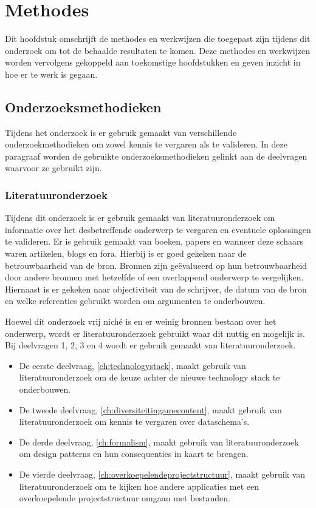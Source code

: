 \chapter{Methodes}
\label{ch:methodes}
Dit hoofdstuk omschrijft de methodes en werkwijzen die toegepast zijn tijdens dit onderzoek om tot de behaalde resultaten te komen. Deze methodes en werkwijzen worden vervolgens gekoppeld aan toekomstige hoofdstukken en geven inzicht in hoe er te werk is gegaan.

\section{Onderzoeksmethodieken}
Tijdens het onderzoek is er gebruik gemaakt van verschillende onderzoekmethodieken om zowel kennis te vergaren als te valideren. In deze paragraaf worden de gebruikte onderzoeksmethodieken gelinkt aan de deelvragen waarvoor ze gebruikt zijn.

\subsection{Literatuuronderzoek}
Tijdens dit onderzoek is er gebruik gemaakt van literatuuronderzoek om informatie over het desbetreffende onderwerp te vergaren en eventuele oplossingen te valideren. Er is gebruik gemaakt van boeken, papers en wanneer deze schaars waren artikelen, blogs en fora. Hierbij is er goed gekeken naar de betrouwbaarheid van de bron. Bronnen zijn geëvalueerd op hun betrouwbaarheid door andere bronnen met hetzelfde of een overlappend onderwerp te vergelijken. Hiernaast is er gekeken naar objectiviteit van de schrijver, de datum van de bron en welke referenties gebruikt worden om argumenten te onderbouwen.

Hoewel dit onderzoek vrij niché is en er weinig bronnen bestaan over het onderwerp, wordt er literatuuronderzoek gebruikt waar dit nuttig en mogelijk is. Bij deelvragen 1, 2, 3 en 4 wordt er gebruik gemaakt van literatuuronderzoek.

\begin{itemize}
    \item De eerste deelvraag, \autoref{ch:technologystack}, maakt gebruik van literatuuronderzoek om de keuze achter de nieuwe technology stack te onderbouwen.
    \item De tweede deelvraag, \autoref{ch:diversiteitingamecontent}, maakt gebruik van literatuuronderzoek om kennis te vergaren over dataschema’s.
    \item De derde deelvraag, \autoref{ch:formalism}, maakt gebruik van literatuuronderzoek om design patterns en hun consequenties in kaart te brengen.
    \item De vierde deelvraag, \autoref{ch:overkoepelendeprojectstructuur}, maakt gebruik van literatuuronderzoek om te kijken hoe andere applicaties met een overkoepelende projectstructuur omgaan met bestanden.
\end{itemize}

